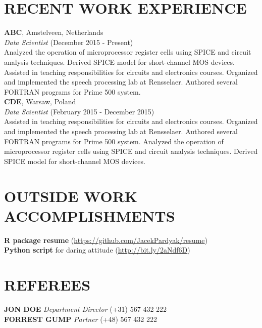 \documentclass[a4paper, line, 11pt]{res} %
\begin{document}
\begin{resume}
\section{RECENT WORK EXPERIENCE}
    \textbf{\uppercase{ABC}}, Amstelveen, Netherlands \\ \emph{Data
Scientist} (December 2015 - Present)\\ Analyzed the operation of
microprocessor register cells using SPICE and circuit analysis
techniques. Derived SPICE model for short-channel MOS devices. Assisted
in teaching responsibilities for circuits and electronics courses.
Organized and implemented the speech processing lab at Rensselaer.
Authored several FORTRAN programs for Prime 500 system. \\
    \textbf{\uppercase{CDE}}, Warsaw, Poland \\ \emph{Data
Scientist} (February 2015 - December 2015)\\ Assisted in teaching
responsibilities for circuits and electronics courses. Organized and
implemented the speech processing lab at Rensselaer. Authored several
FORTRAN programs for Prime 500 system. Analyzed the operation of
microprocessor register cells using SPICE and circuit analysis
techniques. Derived SPICE model for short-channel MOS devices. 


\section{OUTSIDE WORK ACCOMPLISHMENTS}  
\textbf{R package
resume} (\url{https://github.com/JacekPardyak/resume})\\
\textbf{Python script} for daring attitude (\url{http://bit.ly/2aNdf6D})

\section{REFEREES}  

\textbf{\uppercase{Jon Doe}} \emph{Department Director} (+31) 567 432
222\\
\textbf{\uppercase{Forrest Gump}} \emph{Partner} (+48) 567 432 222


\end{resume}
\end{document}

